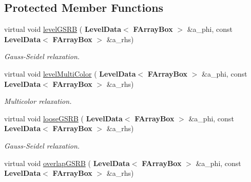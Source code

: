 \subsection*{Protected Member Functions}
\begin{DoxyCompactItemize}
\item 
\mbox{\label{class_darcy_brinkman_op_a0f64c952b5180bb6ab279842b4f0cb50}} 
virtual void \hyperlink{class_darcy_brinkman_op_a0f64c952b5180bb6ab279842b4f0cb50}{level\+G\+S\+RB} (\textbf{ Level\+Data}$<$ \textbf{ F\+Array\+Box} $>$ \&a\+\_\+phi, const \textbf{ Level\+Data}$<$ \textbf{ F\+Array\+Box} $>$ \&a\+\_\+rhs)
\begin{DoxyCompactList}\small\item\em Gauss-\/\+Seidel relaxation. \end{DoxyCompactList}\item 
\mbox{\label{class_darcy_brinkman_op_a62d977a105970a27de2f50989798c3d8}} 
virtual void \hyperlink{class_darcy_brinkman_op_a62d977a105970a27de2f50989798c3d8}{level\+Multi\+Color} (\textbf{ Level\+Data}$<$ \textbf{ F\+Array\+Box} $>$ \&a\+\_\+phi, const \textbf{ Level\+Data}$<$ \textbf{ F\+Array\+Box} $>$ \&a\+\_\+rhs)
\begin{DoxyCompactList}\small\item\em Multicolor relaxation. \end{DoxyCompactList}\item 
\mbox{\label{class_darcy_brinkman_op_a2f0ad8188c617c1f0a560dda3aa88ed1}} 
virtual void \hyperlink{class_darcy_brinkman_op_a2f0ad8188c617c1f0a560dda3aa88ed1}{loose\+G\+S\+RB} (\textbf{ Level\+Data}$<$ \textbf{ F\+Array\+Box} $>$ \&a\+\_\+phi, const \textbf{ Level\+Data}$<$ \textbf{ F\+Array\+Box} $>$ \&a\+\_\+rhs)
\begin{DoxyCompactList}\small\item\em Gauss-\/\+Seidel relaxation. \end{DoxyCompactList}\item 
\mbox{\label{class_darcy_brinkman_op_a5c792a6fc34828e86caa1492346abdbf}} 
virtual void \hyperlink{class_darcy_brinkman_op_a5c792a6fc34828e86caa1492346abdbf}{overlap\+G\+S\+RB} (\textbf{ Level\+Data}$<$ \textbf{ F\+Array\+Box} $>$ \&a\+\_\+phi, const \textbf{ Level\+Data}$<$ \textbf{ F\+Array\+Box} $>$ \&a\+\_\+rhs)

\end{DoxyCompactItemize}
